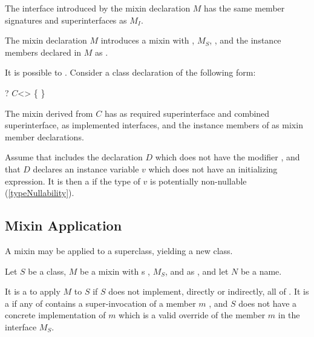 \documentclass[makeidx]{article}
\begin{document}
\LMHash{}%
The interface introduced by the mixin declaration $M$ has the same member
signatures and superinterfaces as $M_I$.

\LMHash{}%
The mixin declaration $M$ introduces a mixin with
,
$M_S$,
,
and the instance members declared in $M$ as
.

\LMHash{}%
It is possible to
.
Consider a class declaration of the following form:

\begin{normativeDartCode}
\ABSTRACT? \CLASS{} $C$<\TypeParametersStd>
    \IMPLEMENTS{}  \{
\}
\end{normativeDartCode}

The mixin derived from $C$ has
 as required superinterface and combined superinterface,
 as implemented interfaces,
and the instance members of  as mixin member declarations.

\LMHash{}%
Assume that  includes the declaration $D$
which does not have the modifier \LATE,
and that $D$ declares an instance variable $v$
which does not have an initializing expression.
It is then a  if
the type of $v$ is potentially non-nullable
(\ref{typeNullability}).


\subsection{Mixin Application}

\LMHash{}%
A mixin may be applied to a superclass, yielding a new class.

\LMHash{}%
Let $S$ be a class,
$M$ be a mixin with s ,
 $M_S$,
  and
 as ,
and let $N$ be a name.

\LMHash{}%
It is a
 to apply $M$ to $S$ if $S$ does not implement,
directly or indirectly, all of .
It is a  if any of  contains a
super-invocation of a member $m$ , and $S$ does not have a concrete
implementation of $m$ which is a valid override of the member $m$ in
the interface $M_S$. 
\end{document}

